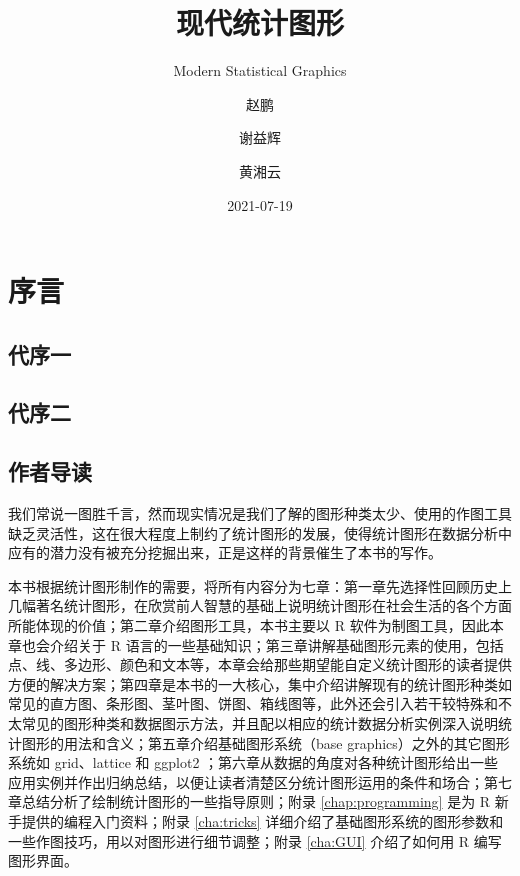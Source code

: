 \documentclass[
  b5paper,
  UTF8,twoside]{book}
\title{现代统计图形}
\subtitle{Modern Statistical Graphics}
\author{赵鹏 \and 谢益辉 \and 黄湘云}
\date{2021-07-19}
\begin{document}
\maketitle

{
\hypersetup{linkcolor=}
\setcounter{tocdepth}{1}
\tableofcontents
}
\listoftables
\listoffigures
\mainmatter

\hypertarget{forword}{%
\chapter*{序言}\label{forword}}

\hypertarget{forword-one}{%
\section*{代序一}\label{forword-one}}

\hypertarget{forword-two}{%
\section*{代序二}\label{forword-two}}

\hypertarget{audience-guide}{%
\section*{作者导读}\label{audience-guide}}

我们常说一图胜千言，然而现实情况是我们了解的图形种类太少、使用的作图工具缺乏灵活性，这在很大程度上制约了统计图形的发展，使得统计图形在数据分析中应有的潜力没有被充分挖掘出来，正是这样的背景催生了本书的写作。

本书根据统计图形制作的需要，将所有内容分为七章：第一章先选择性回顾历史上几幅著名统计图形，在欣赏前人智慧的基础上说明统计图形在社会生活的各个方面所能体现的价值；第二章介绍图形工具，本书主要以 R 软件为制图工具，因此本章也会介绍关于 R 语言的一些基础知识；第三章讲解基础图形元素的使用，包括点、线、多边形、颜色和文本等，本章会给那些期望能自定义统计图形的读者提供方便的解决方案；第四章是本书的一大核心，集中介绍讲解现有的统计图形种类如常见的直方图、条形图、茎叶图、饼图、箱线图等，此外还会引入若干较特殊和不太常见的图形种类和数据图示方法，并且配以相应的统计数据分析实例深入说明统计图形的用法和含义；第五章介绍基础图形系统（base graphics）之外的其它图形系统如 grid、lattice 和 ggplot2 ；第六章从数据的角度对各种统计图形给出一些应用实例并作出归纳总结，以便让读者清楚区分统计图形运用的条件和场合；第七章总结分析了绘制统计图形的一些指导原则；附录 \ref{chap:programming} 是为 R 新手提供的编程入门资料；附录 \ref{cha:tricks} 详细介绍了基础图形系统的图形参数和一些作图技巧，用以对图形进行细节调整；附录 \ref{cha:GUI} 介绍了如何用 R 编写图形界面。
\end{document}
